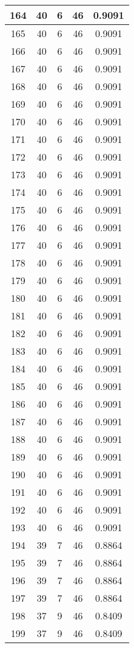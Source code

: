 \documentclass[letterpaper, 12pt]{article}
\begin{document}
\begin{longtable}{|c|c|c|c|c|}
\hline
164 & 40 & 6 & 46 & 0.9091 \\
\hline
165 & 40 & 6 & 46 & 0.9091 \\
\hline
166 & 40 & 6 & 46 & 0.9091 \\
\hline
167 & 40 & 6 & 46 & 0.9091 \\
\hline
168 & 40 & 6 & 46 & 0.9091 \\
\hline
169 & 40 & 6 & 46 & 0.9091 \\
\hline
170 & 40 & 6 & 46 & 0.9091 \\
\hline
171 & 40 & 6 & 46 & 0.9091 \\
\hline
172 & 40 & 6 & 46 & 0.9091 \\
\hline
173 & 40 & 6 & 46 & 0.9091 \\
\hline
174 & 40 & 6 & 46 & 0.9091 \\
\hline
175 & 40 & 6 & 46 & 0.9091 \\
\hline
176 & 40 & 6 & 46 & 0.9091 \\
\hline
177 & 40 & 6 & 46 & 0.9091 \\
\hline
178 & 40 & 6 & 46 & 0.9091 \\
\hline
179 & 40 & 6 & 46 & 0.9091 \\
\hline
180 & 40 & 6 & 46 & 0.9091 \\
\hline
181 & 40 & 6 & 46 & 0.9091 \\
\hline
182 & 40 & 6 & 46 & 0.9091 \\
\hline
183 & 40 & 6 & 46 & 0.9091 \\
\hline
184 & 40 & 6 & 46 & 0.9091 \\
\hline
185 & 40 & 6 & 46 & 0.9091 \\
\hline
186 & 40 & 6 & 46 & 0.9091 \\
\hline
187 & 40 & 6 & 46 & 0.9091 \\
\hline
188 & 40 & 6 & 46 & 0.9091 \\
\hline
189 & 40 & 6 & 46 & 0.9091 \\
\hline
190 & 40 & 6 & 46 & 0.9091 \\
\hline
191 & 40 & 6 & 46 & 0.9091 \\
\hline
192 & 40 & 6 & 46 & 0.9091 \\
\hline
193 & 40 & 6 & 46 & 0.9091 \\
\hline
194 & 39 & 7 & 46 & 0.8864 \\
\hline
195 & 39 & 7 & 46 & 0.8864 \\
\hline
196 & 39 & 7 & 46 & 0.8864 \\
\hline
197 & 39 & 7 & 46 & 0.8864 \\
\hline
198 & 37 & 9 & 46 & 0.8409 \\
\hline
199 & 37 & 9 & 46 & 0.8409 \\
\hline
\end{longtable}
\end{document}
